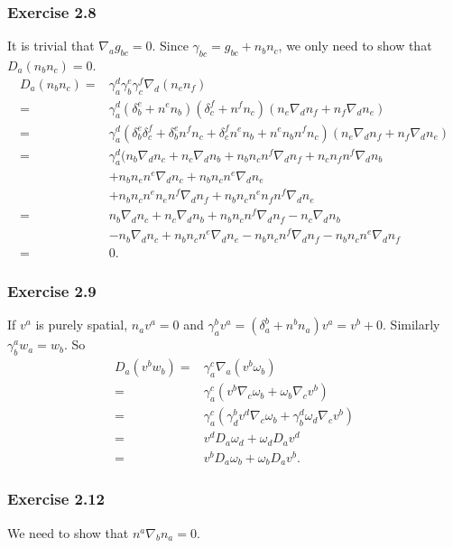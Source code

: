 \documentclass{article}
\begin{document}
\subsubsection*{Exercise 2.8}
It is trivial that $\nabla_a g_{bc}=0$. Since $\gamma_{bc} = g_{bc}+n_bn_c$, we only need to show that $D_a(n_bn_c)=0$.
\begin{align}
	D_a(n_bn_c) =& \gamma^d_a\gamma^e_b\gamma^f_c\nabla_d(n_en_f)\\
	=& \gamma^d_a (\delta^e_b+n^en_b)(\delta^f_c+n^fn_c)(n_e\nabla_dn_f + n_f\nabla_dn_e)\\
	=& \gamma^d_a (\delta^e_b\delta^f_c + \delta^e_b n^f n_c + \delta^f_cn^en_b+n^en_bn^fn_c)(n_e\nabla_d n_f + n_f \nabla_dn_e)\\
	=& \gamma^d_a(n_b\nabla_d n_c + n_c\nabla_d n_b + n_bn_cn^f\nabla_dn_f+n_cn_fn^f\nabla_dn_b\\
	&+ n_bn_en^e\nabla_dn_c + n_bn_cn^e\nabla_dn_e\\ &+n_bn_cn^en_en^f\nabla_dn_f+n_bn_cn^en_fn^f\nabla_dn_e\\
	=& n_b \nabla_dn_c + n_c\nabla_d n_b + n_b n_c n^f \nabla_dn_f - n_c\nabla_dn_b\\
	&-n_b\nabla_dn_c+n_bn_cn^e\nabla_dn_e-n_bn_cn^f\nabla_dn_f-n_bn_cn^e\nabla_dn_f\\
	=&0.
\end{align}

\subsubsection*{Exercise 2.9}
If $v^a$ is purely spatial, $n_av^a = 0$ and $\gamma^b_av^a=(\delta^b_a+n^bn_a)v^a=v^b+0$. Similarly $\gamma^a_bw_a=w_b$. So
\begin{align}
	D_a(v^bw_b) =& \gamma^c_a\nabla_a(v^b\omega_b)\\
	=& \gamma^c_a(v^b\nabla_c\omega_b + \omega_b \nabla_c v^b)\\
	=& \gamma^c_a(\gamma^b_dv^d\nabla_c\omega_b + \gamma^d_b\omega_d\nabla_cv^b)\\
	=& v^d D_a\omega_d + \omega_d D_av^d\\
	=& v^b D_a \omega_b + \omega_b D_a v^b. 
\end{align}

\subsubsection*{Exercise 2.12}
We need to show that $n^a\nabla_b n_a = 0$.
\end{document}
